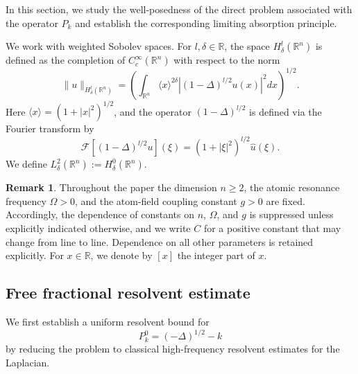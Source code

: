 \documentclass[12pt,a4paper]{amsart}
\numberwithin{equation}{section}
\theoremstyle{plain}
\theoremstyle{definition}
\newtheorem{remark}[theorem]{Remark}
\begin{document}
In this section, we study the well-posedness of the direct problem associated with the operator $P_k$ and establish the corresponding limiting absorption principle.


We work with weighted Sobolev spaces. For $l, \delta \in \mathbb{R}$, 
the space $H^l_\delta(\mathbb{R}^n)$ is defined as the completion of 
$C_c^\infty(\mathbb{R}^n)$ with respect to the norm
\begin{equation*}
    \|u\|_{H^l_\delta(\mathbb{R}^n)}
    =
    \left(
        \int_{\mathbb{R}^n}
        \langle x \rangle^{2\delta}
        |(1-\Delta)^{l/2} u(x)|^2
         dx
    \right)^{1/2}.
\end{equation*}
Here $\langle x \rangle = (1+|x|^2)^{1/2}$, and the operator $(1-\Delta)^{l/2}$ is defined via the Fourier transform by
\begin{equation*}
    \mathcal{F}[(1-\Delta)^{l/2} u](\xi)
    =
    (1+|\xi|^2)^{l/2} \hat u(\xi).
\end{equation*}
We define $L^2_\delta(\mathbb{R}^n) := H^0_\delta(\mathbb{R}^n)$.


\begin{remark}\label{notations}
Throughout the paper the dimension $n\ge 2$, the atomic resonance frequency
$\Omega>0$, and the atom-field coupling constant $g>0$ are fixed.
Accordingly, the dependence of constants on $n$, $\Omega$, and $g$ is
suppressed unless explicitly indicated otherwise, and we write $C$ for a
positive constant that may change from line to line. Dependence on all other
parameters is retained explicitly. For $x\in\mathbb{R}$, we denote by $[x]$
the integer part of $x$.
\end{remark}
















\subsection{Free fractional resolvent estimate}
We first establish a uniform resolvent bound for
$$
P_k^0 = (-\Delta)^{1/2} - k
$$
by reducing the problem to classical high-frequency resolvent estimates for the Laplacian.
\end{document}
